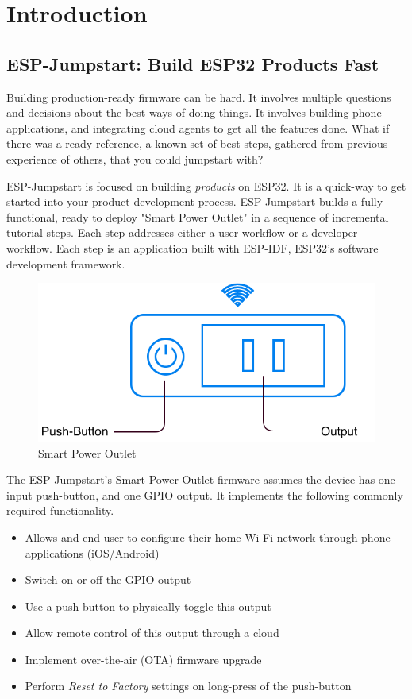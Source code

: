 \documentclass[main.tex]{subfiles}
\begin{document}
\chapter{Introduction}

\section{ESP-Jumpstart: Build ESP32 Products Fast}

Building production-ready firmware can be hard. It involves multiple questions and decisions about the best ways of doing things. It involves building phone applications, and integrating cloud agents to get all the features done. What if there was a ready reference, a known set of best steps, gathered from previous experience of others, that you could jumpstart with?

ESP-Jumpstart is focused on building \textit{products} on ESP32. It is a quick-way to get started into your product development process. ESP-Jumpstart builds a fully functional, ready to deploy "Smart Power Outlet" in a sequence of incremental tutorial steps. Each step addresses either a user-workflow or a developer workflow. Each step is an application built with ESP-IDF, ESP32's software development framework.

\begin{figure}[h!]
    \centering
    \includegraphics[scale=0.4]{../../_static/jumpstart-outlet.png}
    \caption{Smart Power Outlet}
    \label{fig:power_outlet}
\end{figure}

The ESP-Jumpstart's Smart Power Outlet firmware assumes the device has one input push-button, and one GPIO output. It implements the following commonly required functionality.

\begin{itemize}
  \item Allows and end-user to configure their home Wi-Fi network through phone applications (iOS/Android)
  \item Switch on or off the GPIO output
  \item Use a push-button to physically toggle this output
  \item Allow remote control of this output through a cloud
  \item Implement over-the-air (OTA) firmware upgrade
  \item Perform \textit{Reset to Factory} settings on long-press of the push-button
\end{itemize}
\end{document}
